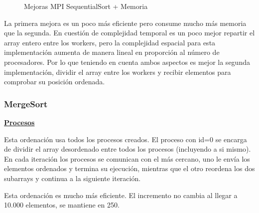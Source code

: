 \begin{figure}[h!]
			\caption{Mejoras MPI SequentialSort + Memoria}
		\end{figure}
		
		La primera mejora es un poco más eficiente pero consume mucho más memoria que la segunda. En cuestión de complejidad temporal es un poco mejor repartir el array entero entre los workers, pero la complejidad espacial para esta implementación aumenta de manera lineal en proporción al número de procesadores. Por lo que teniendo en cuenta ambos aspectos es mejor la segunda implementación, dividir el array entre los workers y recibir elementos para comprobar su posición ordenada.
		
		
		\subsubsection{MergeSort}
		
		\begin{flushleft}
		\begin{mdframed}[roundcorner=5pt]			
			\textbf{\underline{Procesos}}
			\vspace{0.1cm}
			
			\scriptsize	
			Esta ordenación usa todos los procesos creados. El proceso con id=0 se encarga de dividir el array desordenado entre todos los procesos (incluyendo a si mismo). En cada iteración los procesos se comunican con el más cercano, uno le envía los elementos ordenados y termina su ejecución, mientras que el otro reordena los dos subarrays y continua a la siguiente iteración.
		
		\end{mdframed}
		\end{flushleft}		
		
		\begin{tcolorbox}[boxrule=0.5pt, fontupper=\small]
			\scriptsize
			Esta ordenación es mucho más eficiente. El incremento no cambia al llegar a 10.000 elementos, se mantiene en 250.		
		\end{tcolorbox}
		
